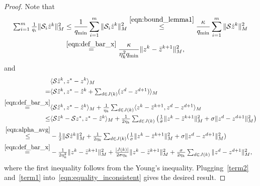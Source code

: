 {\begin{proof}
Note that
\begin{equation}\label{term2}
\begin{aligned}
\textstyle\sum_{i=1}^m\frac{1}{q_i} \|\cS_i\hat{z}^{k}\|_M^2&\le\frac{1}{q_{\min}}
\sum_{i=1}^m\|\cS_i\hat{z}^{k}\|_M^2\overset{\eqref{eqn:bound_lemma1}}{\leq}
\frac{\kappa}{q_{\min}} \sum_{i=1}^m\|\cS\hat{z}^{k}\|^2_M\\
&\overset{\eqref{eqn:def_bar_x}}{=}\frac{\kappa}{\eta_k^2q_{\min}}\|z^k-\bar{z}^{k+1}\|_M^2,
\end{aligned}
\end{equation}
and
\begin{equation}\label{term1}
\begin{aligned}
&\langle \cS \hat{z}^{k}, z^* - z^k \rangle_M\\
=&\textstyle\langle \cS \hat{z}^{k},z^* - \hat{z}^k + \sum_{d\in J(k)} (z^{d} -
z^{d+1})\rangle_M\cr \overset{\eqref{eqn:def_bar_x}}=&\textstyle\langle \cS
\hat{z}^{k}, z^* - \hat{z}^k\rangle_M + \frac{1}{\eta_k}\sum_{d\in J(k)}\langle
z^k-\bar{z}^{k+1}, z^{d} - z^{d+1}\rangle_M\cr \le&\textstyle \langle \cS
\hat{z}^{k}-\cS z^*, z^* - \hat{z}^k\rangle_M+\frac{1}{2\eta_k}\sum_{d\in
J(k)}\big(\frac{1}{\sigma}\|z^k-\bar{z}^{k+1}\|_M^2+ \sigma\|z^{d} -
z^{d+1}\|_M^2\big)\cr \overset{\eqref{eqn:alpha_avg}}\le&\textstyle
-\frac{1}{2}\|\cS \hat{z}^{k}\|_M^2+\frac{1}{2\eta_k}\sum_{d\in
J(k)}(\frac{1}{\sigma}\|z^k-\bar{z}^{k+1}\|_M^2+ \sigma\|z^{d} -
z^{d+1}\|_M^2)\cr
\overset{\eqref{eqn:def_bar_x}}=&\textstyle-\frac{1}{2\eta_k^2}\|z^k-\bar{z}^{k+1}\|_M^2+
\frac{|J(k)|}{2\sigma\eta_k}\|z^k-\bar{z}^{k+1}\|_M^2+\frac{\sigma}{2\eta_k}\sum_{d\in
J(k)}\|z^{d} - z^{d+1}\|_M^2,
\end{aligned}
\end{equation}
where the first inequality follows from the Young's inequality. Plugging~\eqref{term2} and~\eqref{term1} into~\eqref{eqn:equality_inconsistent} gives the desired result.\hfill\end{proof}

}
